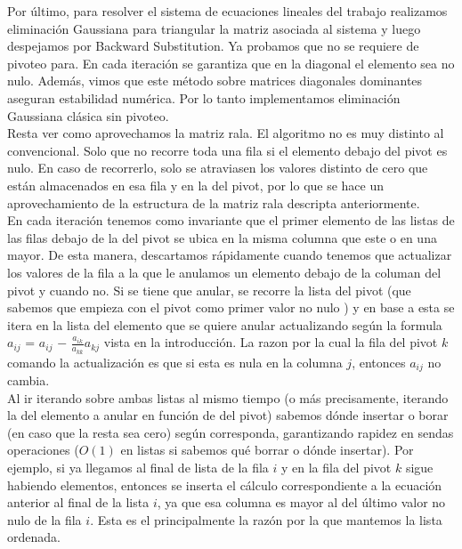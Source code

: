 Por último, para resolver el sistema de ecuaciones lineales del trabajo realizamos eliminación Gaussiana para triangular la matriz asociada al sistema y luego despejamos por Backward Substitution. Ya probamos que no se requiere de pivoteo para. En cada iteración se garantiza que en la diagonal el elemento sea no nulo. Además, vimos que este método sobre matrices diagonales dominantes aseguran estabilidad numérica. Por lo tanto implementamos eliminación Gaussiana clásica sin pivoteo.\\

Resta ver como aprovechamos la matriz rala. El algoritmo no es muy distinto al convencional. Solo que no recorre toda una fila si el elemento debajo del pivot es nulo. En caso de recorrerlo, solo se atraviasen los valores distinto de cero que están almacenados en esa fila y en la del pivot, por lo que se hace un aprovechamiento de la estructura de la matriz rala descripta anteriormente.\\

En cada iteración tenemos como invariante que el primer elemento de las listas de las filas debajo de la del pivot se ubica en la misma columna que este o en una mayor. De esta manera, descartamos rápidamente cuando tenemos que actualizar los valores de la fila a la que le anulamos un elemento debajo de la columan del pivot y cuando no.
Si se tiene que anular, se recorre la lista del pivot (que sabemos que empieza con el pivot como primer valor no nulo ) y en base a esta se itera en la lista del elemento que se quiere anular actualizando según la formula $a_{ij}$ = $a_{ij}$ $-$ $\frac{a_{ik}}{a_{kk}} a_{kj}$ vista en la introducción. La razon por la cual la fila del pivot $k$ comando la actualización es que si esta es nula en la columna $j$, entonces $a_{ij}$ no cambia. \\

Al ir iterando sobre ambas listas al mismo tiempo (o más precisamente, iterando la del elemento a anular en función de del pivot) sabemos dónde insertar o borar (en caso que la resta sea cero) según corresponda, garantizando rapidez en sendas operaciones ($O(1)$ en listas si sabemos qué borrar o dónde insertar). 
Por ejemplo, si ya llegamos al final de lista de la fila $i$ y en la fila del pivot $k$ sigue habiendo elementos, entonces se inserta el cálculo correspondiente a la ecuación anterior al final de la lista $i$, ya que esa columna es mayor al del último valor no nulo de la fila $i$. Esta es el principalmente la razón por la que mantemos la lista ordenada.\\

